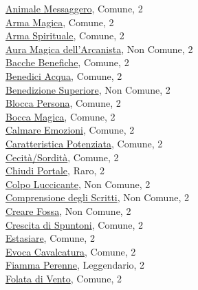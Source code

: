 \begin{multicols}{3}
{{\hyperlink{Animale Messaggero}{Animale Messaggero}, Comune, 2\\
\hyperlink{Arma Magica}{Arma Magica}, Comune, 2\\
\hyperlink{Arma Spirituale}{Arma Spirituale}, Comune, 2\\
\hyperlink{Aura Magica dell'Arcanista}{Aura Magica dell'Arcanista}, Non Comune, 2\\
\hyperlink{Bacche Benefiche}{Bacche Benefiche}, Comune, 2\\
\hyperlink{Benedici Acqua}{Benedici Acqua}, Comune, 2\\
\hyperlink{Benedizione Superiore}{Benedizione Superiore}, Non Comune, 2\\
\hyperlink{Blocca Persona}{Blocca Persona}, Comune, 2\\
\hyperlink{Bocca Magica}{Bocca Magica}, Comune, 2\\
\hyperlink{Calmare Emozioni}{Calmare Emozioni}, Comune, 2\\
\hyperlink{Caratteristica Potenziata}{Caratteristica Potenziata}, Comune, 2\\
\hyperlink{Cecità/Sordità}{Cecità/Sordità}, Comune, 2\\
\hyperlink{Chiudi Portale}{Chiudi Portale}, Raro, 2\\
\hyperlink{Colpo Luccicante}{Colpo Luccicante}, Non Comune, 2\\
\hyperlink{Comprensione degli Scritti}{Comprensione degli Scritti}, Non Comune, 2\\
\hyperlink{Creare Fossa}{Creare Fossa}, Non Comune, 2\\
\hyperlink{Crescita di Spuntoni}{Crescita di Spuntoni}, Comune, 2\\
\hyperlink{Estasiare}{Estasiare}, Comune, 2\\
\hyperlink{Evoca Cavalcatura}{Evoca Cavalcatura}, Comune, 2\\
\hyperlink{Fiamma Perenne}{Fiamma Perenne}, Leggendario, 2\\
\hyperlink{Folata di Vento}{Folata di Vento}, Comune, 2\\
}}
\end{multicols}
